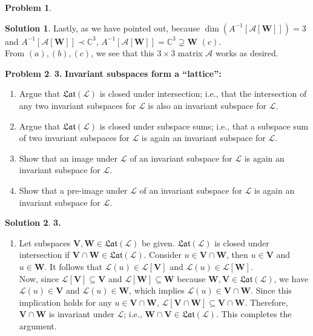 \documentclass{book}
\theoremstyle{definition}
\newtheorem*{prob*}{Problem}
\newtheorem*{sln*}{Solution}
\newcommand{\V}{\mathbf{V}}
\newcommand{\W}{\mathbf{W}}
\newcommand{\lag}{\mathcal{L}}
\begin{document}
\begin{prob*}
\begin{sln*}
		\noindent Lastly, as we have pointed out, because    $\dim\left(A^{-1}\left[\mathcal{A}[\W]\right]\right) = 3$ and $A^{-1}\left[\mathcal{A}[\W]\right] \prec \mathbb{C}^3$, $A^{-1}\left[\mathcal{A}[\W]\right] = \mathbb{C}^3 \supsetneq \W$ $(c)$.\\
		
		\noindent From $(a),(b),(c)$, we see that this $3\times 3$ matrix $\mathcal{A}$ works as desired.   
	\end{sln*}
	
	
\end{prob*}









\newpage

\begin{prob*}\textbf{3.}
	\textbf{Invariant subspaces form a ``lattice'':}
	\begin{enumerate}
		\item Argue that $\mathfrak{Lat}(\lag)$ is closed under intersection; i.e., that the intersection of any two invariant subspaces for $\lag$ is also an invariant subspace for $\lag$.
		\item Argue that $\mathfrak{Lat}(\lag)$ is closed under subspace sums; i.e., that a subspace sum of two invariant subspaces for $\lag$ is again an invariant subspace for $\lag$.
		\item Show that an image under $\lag$ of an invariant subspace for $\lag$ is again an invariant subspace for $\lag$.
		\item Show that a pre-image under $\lag$ of an invariant subspace for $\lag$ is again an invariant subspace for $\lag$. 
	\end{enumerate}
	
	
	\begin{sln*}\textbf{3.}
		$\,$
		\begin{enumerate}
			\item Let subspaces $\V, \W \in \mathfrak{Lat}(\lag)$ be given. $\mathfrak{Lat}(\lag)$ is closed under intersection if $\V \cap \W \in \mathfrak{Lat}(\lag)$. Consider $u\in \V\cap\W$, then $u\in\V$ and $u\in\W$. It follows that $\lag(u)\in \lag[\V]$ and $\lag(u)\in \lag[\W]$.\\
			
			Now, since $\lag[\V]\subseteq \V$ and $\lag[\W]\subseteq \W$ because $\W,\V \in \mathfrak{Lat}(\lag)$, we have $\lag(u)\in\V$ and $\lag(u)\in \W$, which implies $\lag(u)\in \V\cap \W$. Since this implication holds for any $u\in \V\cap\W$, $\lag[\V\cap\W]\subseteq \V\cap\W$. Therefore, $\V\cap\W$ is invariant under $\lag$; i.e., $\W\cap\V \in \mathfrak{Lat}(\lag)$. This completes the argument. \\
			

\end{enumerate}
\end{sln*}
\end{prob*}
\end{document}
